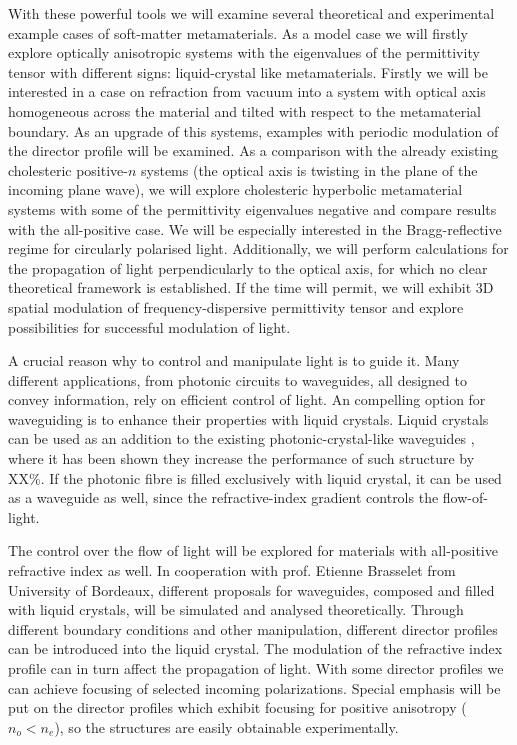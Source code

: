 \documentclass[a4paper,11pt]{article}
\begin{document}
With these powerful tools we will examine several theoretical and experimental example cases of soft-matter metamaterials. 
As a model case we will firstly explore optically anisotropic systems with the eigenvalues of the permittivity tensor with different signs: liquid-crystal like metamaterials. 
Firstly we will be interested in a case on refraction from vacuum into a system with optical axis homogeneous across the material and tilted with respect to the metamaterial boundary. 
As an upgrade of this systems, examples with periodic modulation of the director profile will be examined. 
As a comparison with the already existing cholesteric positive-$n$ systems (the optical axis is twisting in the plane of the incoming plane wave), we will explore cholesteric hyperbolic metamaterial systems with some of the permittivity eigenvalues negative and compare results with the all-positive case. 
We will be especially interested in the Bragg-reflective regime for circularly polarised light. 
Additionally, we will perform calculations for the propagation of light perpendicularly to the optical axis, for which no clear theoretical framework is established. 
If the time will permit, we will exhibit 3D spatial modulation of frequency-dispersive permittivity tensor and explore possibilities for successful modulation of light.  


A crucial reason why to control and manipulate light is to guide it. 
Many different applications, from photonic circuits to waveguides, all designed to convey information, rely on efficient control of light. 
An compelling option for waveguiding is to enhance their properties with liquid crystals. 
Liquid crystals can be used as an addition to the existing photonic-crystal-like waveguides \cite{dd}, where it has been shown they increase the performance of such structure by XX\%. 
If the photonic fibre is filled exclusively with liquid crystal, it can be used as a waveguide as well, since the refractive-index gradient controls the flow-of-light. 

The control over the flow of light will be explored for materials with all-positive refractive index as well. 
In cooperation with prof. Etienne Brasselet from University of Bordeaux, different proposals for waveguides, composed and filled with liquid crystals, will be simulated and analysed theoretically. 
Through different boundary conditions and other manipulation, different director profiles can be introduced into the liquid crystal. 
The modulation of the refractive index profile can in turn affect the propagation of light. 
With some director profiles we can achieve focusing of selected incoming polarizations.
Special emphasis will be put on the director profiles which exhibit focusing for positive anisotropy ($n_{o} < n_e$), so the structures are easily obtainable experimentally. 
\end{document}
